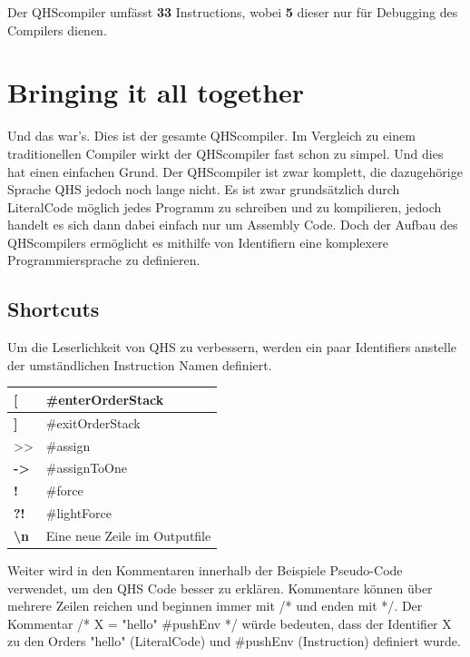 Der QHScompiler umfässt \textbf{33} Instructions, wobei \textbf{5} dieser nur für Debugging des Compilers dienen.

\section{Bringing it all together} \label{sec:qhs-bringing-it-together}
Und das war's. Dies ist der gesamte QHScompiler. Im Vergleich zu einem traditionellen Compiler wirkt der QHScompiler fast schon zu simpel. Und dies hat einen einfachen Grund. Der QHScompiler ist zwar komplett,
die dazugehörige Sprache QHS jedoch noch lange nicht. Es ist zwar grundsätzlich durch LiteralCode möglich jedes Programm zu schreiben und zu kompilieren, jedoch handelt es sich dann dabei einfach nur um Assembly Code.
Doch der Aufbau des QHScompilers ermöglicht es mithilfe von Identifiern eine komplexere Programmiersprache zu definieren.

\subsection{Shortcuts}
Um die Leserlichkeit von QHS zu verbessern, werden ein paar Identifiers anstelle der umständlichen Instruction Namen definiert.

{
\begin{table}[H]
    \centering
    \begin{tabular}{>{\listingFont\selectfont}l|l}
    \textbf{{[}}                 & \#enterOrderStack              \\ \hline
    \textbf{{]}}                 & \#exitOrderStack               \\ \hline
    \textgreater{}\textgreater{} & \#assign                       \\ \hline
    \textbf{-\textgreater{}}     & \#assignToOne                  \\ \hline
    \textbf{!}                   & \#force                        \\ \hline
    \textbf{?!}                  & \#lightForce                   \\ \hline
    \textbf{\textbackslash{}n}   & Eine neue Zeile im Outputfile
    \end{tabular}
\end{table}
}

Weiter wird in den Kommentaren innerhalb der Beispiele Pseudo-Code verwendet, um den QHS Code besser zu erklären. Kommentare können über mehrere Zeilen reichen und beginnen immer mit /* und enden mit */.
Der Kommentar /* X = "hello" \#pushEnv */ würde bedeuten, dass der Identifier X zu den Orders "hello" (LiteralCode) und \#pushEnv (Instruction) definiert wurde. 

